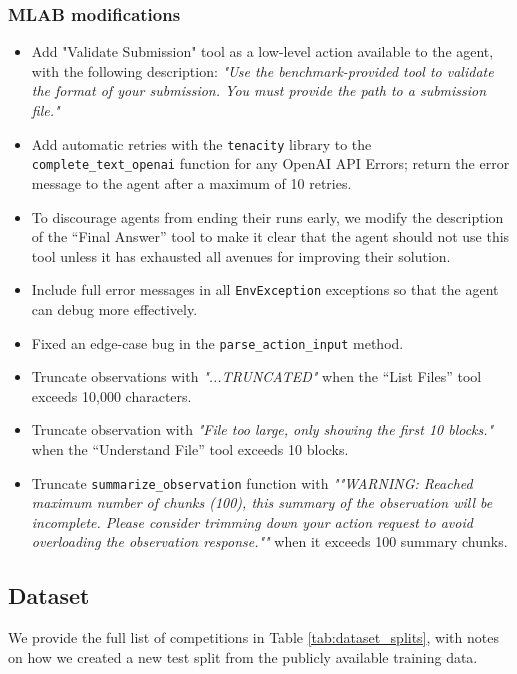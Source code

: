 \documentclass{article} %
\begin{document}
\subsubsection{MLAB modifications}

\begin{itemize}
    \item Add "Validate Submission" tool as a low-level action available to the agent, with the following description: \textit{"Use the benchmark-provided tool to validate the format of your submission. You must provide the path to a submission file."}
    \item Add automatic retries with the \texttt{tenacity} library to the \texttt{complete\_text\_openai} function for any OpenAI API Errors; return the error message to the agent after a maximum of 10 retries.
    \item To discourage agents from ending their runs early, we modify the description of the ``Final Answer'' tool to make it clear that the agent should not use this tool unless it has exhausted all avenues for improving their solution.
    \item Include full error messages in all \texttt{EnvException} exceptions so that the agent can debug more effectively.
    \item Fixed an edge-case bug in the \texttt{parse\_action\_input} method.
    \item Truncate observations with \textit{"...TRUNCATED"} when the ``List Files'' tool exceeds 10,000 characters.
    \item Truncate observation with \textit{"File too large, only showing the first 10 blocks."} when the ``Understand File'' tool exceeds 10 blocks.
    \item Truncate \texttt{summarize\_observation} function with \textit{""WARNING: Reached maximum number of chunks (100), this summary of the observation will be incomplete. Please consider trimming down your action request to avoid overloading the observation response.""} when it exceeds 100 summary chunks.
\end{itemize}


\subsection{Dataset}\label{app:dataset}
We provide the full list of competitions in Table \ref{tab:dataset_splits}, with notes on how we created a new test split from the publicly available training data.
\end{document}
